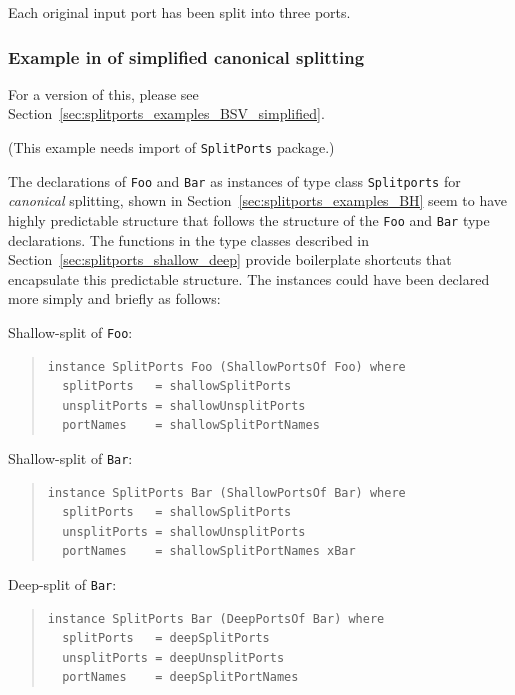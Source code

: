 Each original input port has been split into three ports.


\subsubsection{Example in {\BHb} of simplified canonical splitting}

\label{sec:splitports_examples_BH_simplified}


{\footnotesize  For a {\BSVb} version of this, please see
  Section~\ref{sec:splitports_examples_BSV_simplified}.}

{\footnotesize (This example needs import of {\tt SplitPorts} package.)}

The declarations of {\tt Foo} and {\tt Bar} as instances of type class
{\tt Splitports} for \emph{canonical} splitting, shown in
Section~\ref{sec:splitports_examples_BH} seem to have highly
predictable structure that follows the structure of the {\tt Foo} and
{\tt Bar} type declarations. The functions in the type classes
described in Section~\ref{sec:splitports_shallow_deep} provide
boilerplate shortcuts that encapsulate this predictable structure.
The instances could have been declared more simply and briefly as
follows:

Shallow-split of {\tt Foo}:
\begin{quote}
\begin{verbatim}
instance SplitPorts Foo (ShallowPortsOf Foo) where
  splitPorts   = shallowSplitPorts
  unsplitPorts = shallowUnsplitPorts
  portNames    = shallowSplitPortNames
\end{verbatim}
\end{quote}

Shallow-split of {\tt Bar}:
\begin{quote}
\begin{verbatim}
instance SplitPorts Bar (ShallowPortsOf Bar) where
  splitPorts   = shallowSplitPorts
  unsplitPorts = shallowUnsplitPorts
  portNames    = shallowSplitPortNames xBar
\end{verbatim}
\end{quote}

Deep-split of {\tt Bar}:
\begin{quote}
\begin{verbatim}
instance SplitPorts Bar (DeepPortsOf Bar) where
  splitPorts   = deepSplitPorts
  unsplitPorts = deepUnsplitPorts
  portNames    = deepSplitPortNames
\end{verbatim}
\end{quote}

